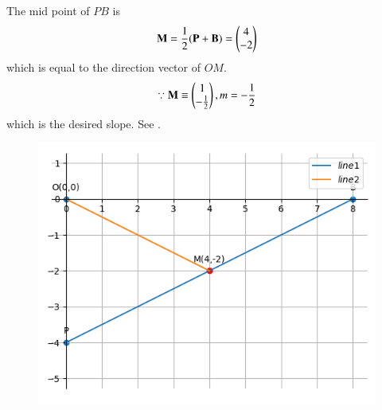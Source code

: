 The mid point of $PB$ is
\begin{align}
\mathbf{M} =\frac{1}{2}(\mathbf{P}+\mathbf{B})
	= \begin{pmatrix}4 \\ -2\end{pmatrix}  
\end{align}
which is equal to the direction vector of $OM$.
\begin{align}
\because \mathbf{M} \equiv
	 \begin{pmatrix}1 \\ -\frac{1}{2}\end{pmatrix},
	m = -\frac{1}{2}
\end{align}
which is the desired slope.
See 
		.
	\begin{figure}[!ht]
		\centering
 \includegraphics[width=\columnwidth]{chapters/11/10/1/5/figs/line.png}
		\caption{}
		\label{fig:11/10/1/5}
  	\end{figure}
